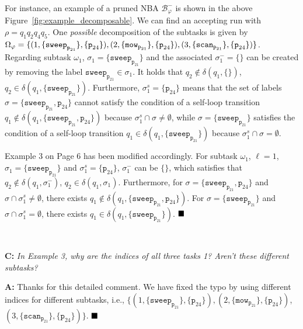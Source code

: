 \documentclass[10pt]{article}
\begin{document}
For instance, an example of a pruned NBA $\mathcal{B}_{\varphi}^-$ is shown in the above Figure~\ref{fig:example_decomposable}.
We can find an accepting run with $\rho=q_1q_2q_4q_5$.
One \emph{possible} decomposition of the subtasks is given by $\Omega_\varphi=\{(1,\{\texttt{sweep}_{\texttt{p}_{21}}\},\{ \texttt{p}_{24}\}),
(2,\{\texttt{mow}_{\texttt{p}_{21}}\}, \{\texttt{p}_{24}\}),\\
(3, \{\texttt{scan}_{\texttt{p}_{21}}\}, \{ \texttt{p}_{24}\})\}$.
Regarding subtask $\omega_1$, $\sigma_1=\{\texttt{sweep}_{\texttt{p}_{21}}\}$ and
the associated $\sigma^-_1=\{\}$ can be created by removing the label $\texttt{sweep}_{\texttt{p}_{21}}\in \sigma_1$.
It holds that $q_2\notin \delta(q_1,\{\})$, $q_2\in\delta(q_1,\{\texttt{sweep}_{\texttt{p}_{21}}\})$.
Furthermore, $\sigma^s_1=\{\texttt{p}_{24}\}$ means that the set of labels
$\sigma=\{\texttt{sweep}_{\texttt{p}_{21}}, \texttt{p}_{24}\}$ cannot satisfy
the condition of a self-loop transition $q_1\notin \delta(q_1, \{\texttt{sweep}_{\texttt{p}_{21}}, \texttt{p}_{24}\})$ because $\sigma^s_1\cap\sigma\neq\emptyset$, while
$\sigma=\{\texttt{sweep}_{\texttt{p}_{21}}\}$ satisfies the condition of a self-loop
transition $q_1\in \delta(q_1,\{\texttt{sweep}_{\texttt{p}_{21}}\})$ because
$\sigma^s_1\cap\sigma=\emptyset$.

Example 3 on Page 6 has been modified accordingly.
{For subtask $\omega_1$, $\ell=1$, $\sigma_1=\{\texttt{sweep}_{\texttt{p}_{21}}\}$ and $\sigma^s_1=\{\texttt{p}_{24}\}$,
$\sigma^-_1$ can be $\{\}$, which satisfies that $q_2\notin
	\delta(q_1,\sigma^-_1)$, $q_2\in\delta(q_1,\sigma_1)$.
Furthermore, for $\sigma=\{\texttt{sweep}_{\texttt{p}_{21}}, \texttt{p}_{24}\}$ and $\sigma\cap\sigma^s_1\neq\emptyset$, there exists $q_1\notin \delta(q_1, \{\texttt{sweep}_{\texttt{p}_{21}}, \texttt{p}_{24}\})$.
For $\sigma=\{\texttt{sweep}_{\texttt{p}_{21}}\}$ and $\sigma\cap\sigma^s_1=\emptyset$, there exists $q_1\in \delta(q_1,\{\texttt{sweep}_{\texttt{p}_{21}}\})$.}
$\hfill\blacksquare$

\hspace*{\fill} \




\textbf{C:}
\emph{In Example 3, why are the indices of all three tasks 1? Aren't these
	different subtasks?
}

\textbf{A:}  Thanks for this detailed comment.
We have fixed the typo by using different indices for different subtasks,
i.e., $\{(1,\{\texttt{sweep}_{\texttt{p}_{21}}\},\{\texttt{p}_{24}\}),
(2,\{\texttt{mow}_{\texttt{p}_{21}}\}, \{\texttt{p}_{24}\})$,
$(3, \{\texttt{scan}_{\texttt{p}_{21}}\}, \{ \texttt{p}_{24}\})\}$.
$\hfill\blacksquare$
\end{document}
